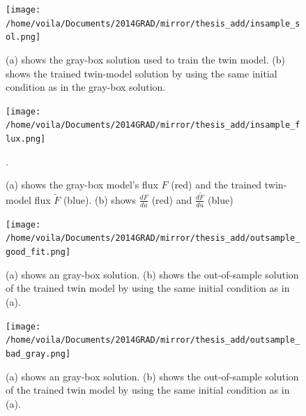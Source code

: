 
\begin{figure}[htbp]\begin{center}
    \texttt{[image: /home/voila/Documents/2014GRAD/mirror/thesis\_add/insample\_sol.png]}
    \caption{(a) shows the gray-box solution used to train the twin model. (b) shows the trained twin-model 
             solution by using the same initial condition as in the gray-box solution.}
    \label{fig: insample test}
\end{center}\end{figure}

\begin{figure}[htbp]\begin{center}
    \texttt{[image: /home/voila/Documents/2014GRAD/mirror/thesis\_add/insample\_flux.png]}
    \caption{(a) shows the gray-box model's flux $F$ (red) and the trained twin-model flux $\tilde{F}$ (blue).
             (b) shows $\frac{dF}{du}$ (red) and $\frac{d \tilde{F}}{du}$ (blue)}.
    \label{fig: flux test}
\end{center}\end{figure}

\begin{figure}[htbp]\begin{center}
    \texttt{[image: /home/voila/Documents/2014GRAD/mirror/thesis\_add/outsample\_good\_fit.png]}
    \caption{(a) shows an gray-box solution. (b) shows the out-of-sample solution of the trained twin model by using the
             same initial condition as in (a).}
    \label{fig: outsample good test}
\end{center}\end{figure}

\begin{figure}[htbp]\begin{center}
    \texttt{[image: /home/voila/Documents/2014GRAD/mirror/thesis\_add/outsample\_bad\_gray.png]}
    \caption{(a) shows an gray-box solution. (b) shows the out-of-sample solution of the trained twin model by using the
             same initial condition as in (a).}
    \label{fig: outsample bad test}
\end{center}\end{figure}

